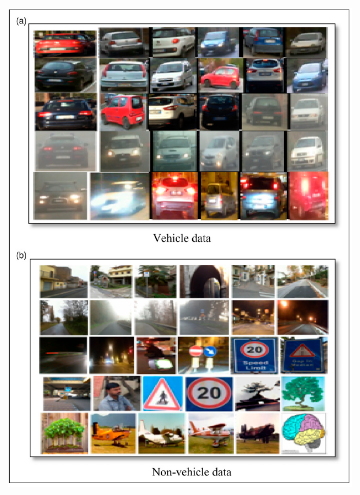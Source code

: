 \begin{figure}[!ht]
\begin{subfigure}{0.4\textwidth}
        \includegraphics[width=\textwidth]{img/82}\label{fig:86}
    \end{subfigure}
\end{figure}
\clearpage
